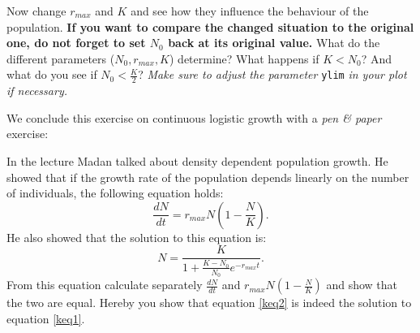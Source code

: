\documentclass{article}\usepackage[]{graphicx}\usepackage[]{color}
\begin{document}
Now change $r_{max}$ and $K$ and see how they influence the behaviour of the population. \textbf{If you want to compare the changed situation to the original one, do not forget to set $N_0$ back at its original value.} What do the different parameters ($N_0,r_{max}, K$) determine? What happens if $K<N_0$? And what do you see if $N_0 < \frac{K}{2}$? \textit{Make sure to adjust the parameter} \texttt{ylim} \textit{in your plot if necessary.}

We conclude this exercise on continuous logistic growth with a \textit{pen \& paper} exercise:
\begin{Exercise}[title=Logistic Growth,label=kloge1,difficulty=2]
\noindent In the lecture Madan talked about density dependent population growth. He showed that if the growth rate of the population depends linearly on the number of individuals, the following equation holds:
\begin{equation}
\frac{dN}{dt} = r_{max} N \left( 1-\frac{N}{K}\right).
\label{keq1}
\end{equation}
He also showed that the solution to this equation is:
\begin{equation}
N = \frac{K}{1+\frac{K-N_0}{N_0}e^{-r_{max}t}}.
\label{keq2}
\end{equation}
From this equation calculate separately $\frac{dN}{dt}$ and  $r_{max} N \left( 1-\frac{N}{K}\right) $ and show that the two are equal. Hereby you show that equation \ref{keq2} is indeed the solution to equation \ref{keq1}.

\end{Exercise}
\end{document}
